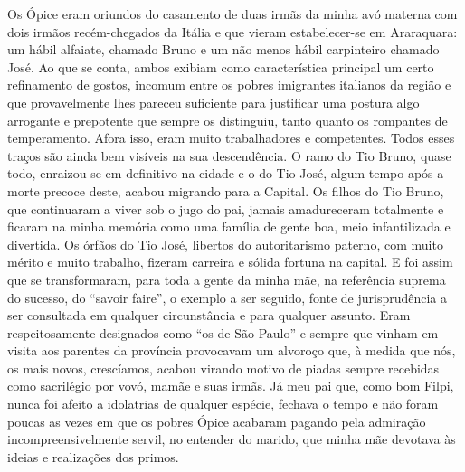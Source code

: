 Os Ópice eram oriundos do casamento de duas irmãs da minha avó materna com dois irmãos recém-chegados da Itália e que vieram estabelecer-se em Araraquara: um hábil alfaiate, chamado Bruno e um não menos hábil carpinteiro chamado José. 
Ao que se conta, ambos exibiam como característica principal um certo refinamento de gostos, incomum entre os pobres imigrantes italianos da região e que provavelmente lhes pareceu suficiente para justificar uma postura algo arrogante e prepotente que sempre os distinguiu, tanto quanto os rompantes de temperamento. 
Afora isso, eram muito trabalhadores e competentes. Todos esses traços são ainda bem visíveis na sua descendência. 
O ramo do Tio Bruno, quase todo, enraizou-se em definitivo na cidade e o do Tio José, algum tempo após a morte precoce deste, acabou migrando para a Capital. 
Os filhos do Tio Bruno, que continuaram a viver sob o jugo do pai, jamais amadureceram totalmente e ficaram na minha memória como uma família de gente boa, meio infantilizada e divertida. 
Os órfãos do Tio José, libertos do autoritarismo paterno, com muito mérito e muito trabalho, fizeram carreira e sólida fortuna na capital. 
E foi assim que se transformaram, para toda a gente da minha mãe, na referência suprema do sucesso, do “savoir faire”, o exemplo a ser seguido, fonte de jurisprudência a ser consultada em qualquer circunstância e para qualquer assunto. 
Eram respeitosamente designados como “os de São Paulo” e sempre que vinham em visita aos parentes da província provocavam um alvoroço que, à medida que nós, os mais novos, crescíamos, acabou virando motivo de piadas sempre recebidas como sacrilégio por vovó, mamãe e suas irmãs. 
Já meu pai que, como bom Filpi, nunca foi afeito a idolatrias de qualquer espécie, fechava o tempo e não foram poucas as vezes em que os pobres Ópice acabaram pagando pela admiração incompreensivelmente servil, no entender do marido, que minha mãe devotava às ideias e realizações dos primos.
